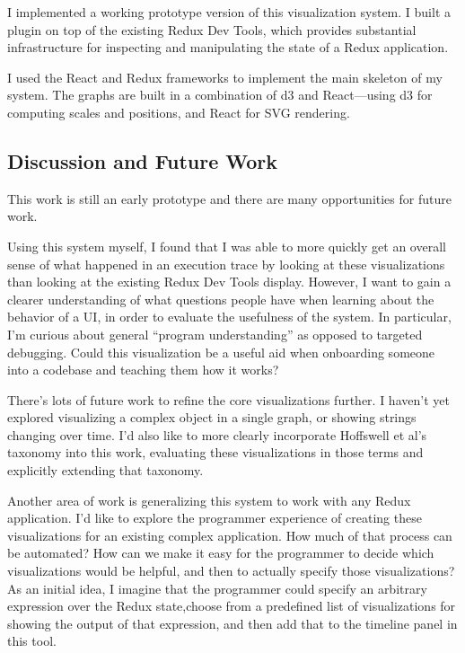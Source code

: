 \documentclass{sigchi}
\begin{document}
I implemented a working prototype version of this visualization system.
I built a plugin on top of the existing Redux Dev Tools, which provides
substantial infrastructure for inspecting and manipulating the state of
a Redux application.

I used the React and Redux frameworks to implement the main skeleton of
my system. The graphs are built in a combination of d3 and React---using
d3 for computing scales and positions, and React for SVG rendering.

\hypertarget{sec:discussion}{%
\subsection{Discussion and Future Work}\label{sec:discussion}}

This work is still an early prototype and there are many opportunities
for future work.

Using this system myself, I found that I was able to more quickly get an
overall sense of what happened in an execution trace by looking at these
visualizations than looking at the existing Redux Dev Tools display.
However, I want to gain a clearer understanding of what questions people
have when learning about the behavior of a UI, in order to evaluate the
usefulness of the system. In particular, I'm curious about general
``program understanding'' as opposed to targeted debugging. Could this
visualization be a useful aid when onboarding someone into a codebase
and teaching them how it works?

There's lots of future work to refine the core visualizations further. I
haven't yet explored visualizing a complex object in a single graph, or
showing strings changing over time. I'd also like to more clearly
incorporate Hoffswell et al's taxonomy \autocite{hoffswell2018a} into
this work, evaluating these visualizations in those terms and explicitly
extending that taxonomy.

Another area of work is generalizing this system to work with any Redux
application. I'd like to explore the programmer experience of creating
these visualizations for an existing complex application. How much of
that process can be automated? How can we make it easy for the
programmer to decide which visualizations would be helpful, and then to
actually specify those visualizations? As an initial idea, I imagine
that the programmer could specify an arbitrary expression over the Redux
state,choose from a predefined list of visualizations for showing the
output of that expression, and then add that to the timeline panel in
this tool.
\end{document}
